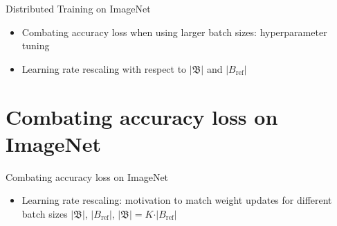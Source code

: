\begin{frame}{Distributed Training on ImageNet}
\protect\hypertarget{distributed-training-on-imagenet-1}{}
\begin{itemize}
\tightlist
\item
  Combating accuracy loss when using larger batch sizes: hyperparameter
  tuning
\item
  Learning rate rescaling with respect to \(\vert \mathfrak{B} \vert\)
  and \(\vert B_{\text{ref}} \vert\)
\end{itemize}

\end{frame}

\hypertarget{combating-accuracy-loss-on-imagenet}{%
\section{Combating accuracy loss on
ImageNet}\label{combating-accuracy-loss-on-imagenet}}

\begin{frame}{Combating accuracy loss on ImageNet}
\begin{itemize}
\tightlist
\item
  Learning rate rescaling: motivation to match weight updates for
  different batch sizes \(\vert \mathfrak{B} \vert\),
  \(\vert B_{\text{ref}} \vert\),
  \(\vert \mathfrak{B} \vert = K \cdot \vert B_{\text{ref}} \vert\)
\end{itemize}

\end{frame}

